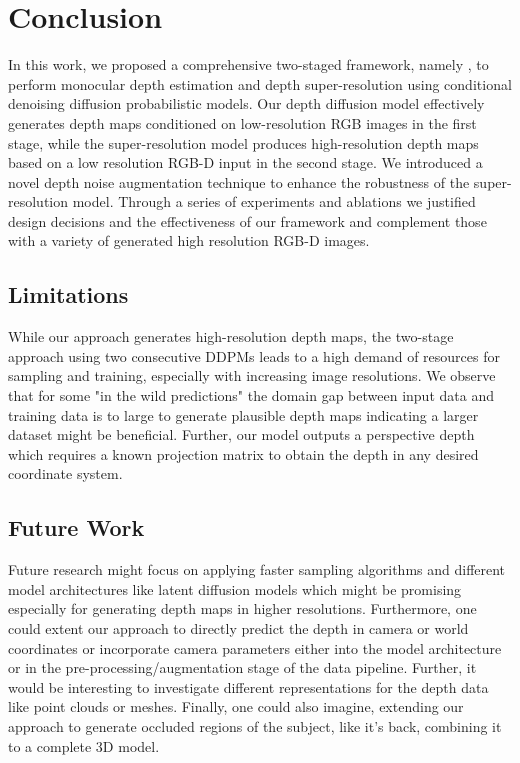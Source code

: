 \section{Conclusion} \label{sec:conclusion}
In this work, we proposed a comprehensive two-staged framework, namely \modelname{}, to perform monocular depth estimation and depth super-resolution using conditional denoising diffusion probabilistic models. Our depth diffusion model effectively generates depth maps conditioned on low-resolution RGB images in the first stage, while the super-resolution model produces high-resolution depth maps based on a low resolution RGB-D input in the second stage. We introduced a novel depth noise augmentation technique to enhance the robustness of the super-resolution model. Through a series of experiments and ablations we justified design decisions and the effectiveness of our framework and complement those with a variety of generated high resolution RGB-D images.

\subsection{Limitations} \label{subsec:limitations}
While our approach generates high-resolution depth maps, the two-stage approach using two consecutive DDPMs leads to a high demand of resources for sampling and training, especially with increasing image resolutions. We observe that for some "in the wild predictions" the domain gap between input data and training data is to large to generate plausible depth maps indicating a larger dataset might be beneficial. Further, our model outputs a perspective depth which requires a known projection matrix to obtain the depth in any desired coordinate system.

\subsection{Future Work} \label{subsec:future_work}
 Future research might focus on applying faster sampling algorithms and different model architectures like latent diffusion models which might be promising especially for generating depth maps in higher resolutions. Furthermore, one could extent our approach to directly predict the depth in camera or world coordinates or incorporate camera parameters either into the model architecture or in the pre-processing/augmentation stage of the data pipeline. Further, it would be interesting to investigate different representations for the depth data like point clouds or meshes. Finally, one could also imagine, extending our approach to generate occluded regions of the subject, like it's back, combining it to a complete 3D model.